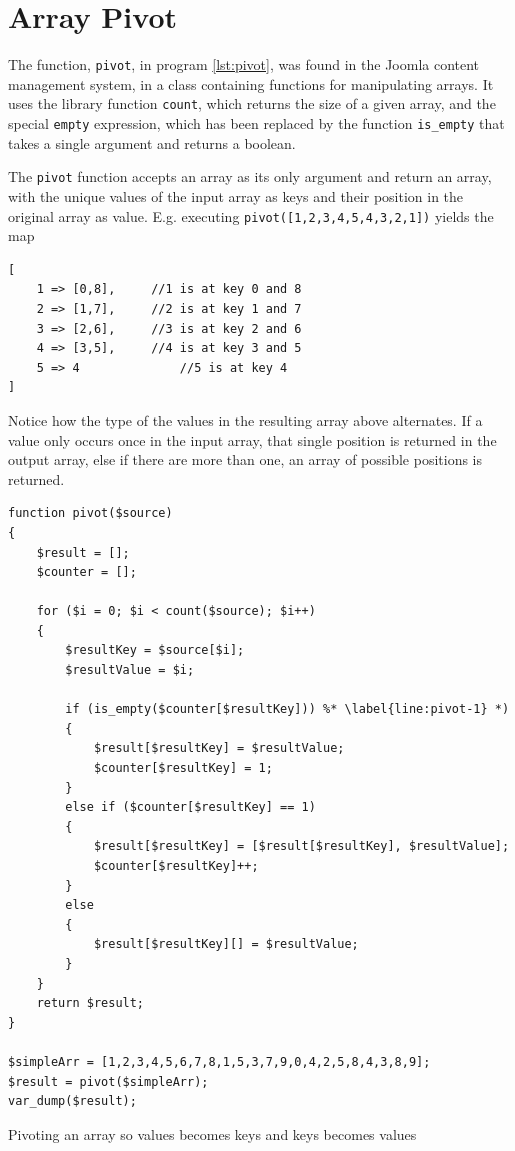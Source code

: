 \section{Array Pivot}
The function, \texttt{pivot}, in program \ref{lst:pivot}, was found in the Joomla content management system, in a class containing functions for manipulating arrays. It uses the library function \texttt{count}, which returns the size of a given array, and the special \texttt{empty} expression, which has been replaced by the function \texttt{is\_empty} that takes a single argument and returns a boolean. 

The \texttt{pivot} function accepts an array as its only argument and return an array, with the unique values of the input array as keys and their position in the original array as value. E.g. executing \texttt{pivot([1,2,3,4,5,4,3,2,1])} yields the map
\begin{lstlisting}[style=nonumbers]
[
	1 => [0,8], 	//1 is at key 0 and 8
	2 => [1,7], 	//2 is at key 1 and 7
	3 => [2,6], 	//3 is at key 2 and 6
	4 => [3,5], 	//4 is at key 3 and 5
	5 => 4  			//5 is at key 4
]
\end{lstlisting}
Notice how the type of the values in the resulting array above alternates. If a value only occurs once in the input array, that single position is returned in the output array, else  if there are more than one, an array of possible positions is returned.
\begin{program}
\begin{lstlisting}
function pivot($source)
{
    $result = [];
    $counter = [];

    for ($i = 0; $i < count($source); $i++)
    {
        $resultKey = $source[$i];
        $resultValue = $i;

        if (is_empty($counter[$resultKey])) %* \label{line:pivot-1} *)
        {
            $result[$resultKey] = $resultValue;
            $counter[$resultKey] = 1;
        }
        else if ($counter[$resultKey] == 1)
        {
            $result[$resultKey] = [$result[$resultKey], $resultValue];
            $counter[$resultKey]++;
        }
        else
        {
            $result[$resultKey][] = $resultValue;
        }
    }
    return $result;
}

$simpleArr = [1,2,3,4,5,6,7,8,1,5,3,7,9,0,4,2,5,8,4,3,8,9];
$result = pivot($simpleArr);
var_dump($result);
\end{lstlisting}
\caption{Pivoting an array so values becomes keys and keys becomes values}
\label{lst:pivot}
\end{program}

